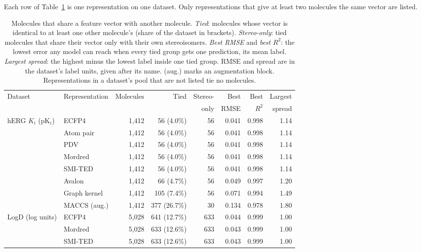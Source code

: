 Each row of Table~\ref{tab:flaws:ties} is one representation on one dataset. Only representations that give at least two molecules the same vector are listed.
\begin{table}[htbp]
\centering
\small
\setlength{\tabcolsep}{4pt}
\caption[Molecules that share a feature vector with another molecule.]{Molecules that share a feature vector with another molecule. \emph{Tied}: molecules whose vector is identical to at least one other molecule's (share of the dataset in brackets). \emph{Stereo-only}: tied molecules that share their vector only with their own stereoisomers. \emph{Best RMSE} and \emph{best $R^2$}: the lowest error any model can reach when every tied group gets one prediction, its mean label. \emph{Largest spread}: the highest minus the lowest label inside one tied group. RMSE and spread are in the dataset's label units, given after its name. (aug.) marks an augmentation block. Representations in a dataset's pool that are not listed tie no molecules.}
\label{tab:flaws:ties}
\begin{adjustbox}{max width=\textwidth}
\begin{tabular}{llrrrrrr}
\toprule
Dataset & Representation & Molecules & Tied & Stereo- & Best & Best & Largest \\
 & & & & only & RMSE & $R^2$ & spread \\
\midrule
hERG $K_i$ (pK$_i$) & ECFP4 & 1,412 & 56 (4.0\%) & 56 & 0.041 & 0.998 & 1.14 \\
 & Atom pair & 1,412 & 56 (4.0\%) & 56 & 0.041 & 0.998 & 1.14 \\
 & PDV & 1,412 & 56 (4.0\%) & 56 & 0.041 & 0.998 & 1.14 \\
 & Mordred & 1,412 & 56 (4.0\%) & 56 & 0.041 & 0.998 & 1.14 \\
 & SMI-TED & 1,412 & 56 (4.0\%) & 56 & 0.041 & 0.998 & 1.14 \\
 & Avalon & 1,412 & 66 (4.7\%) & 56 & 0.049 & 0.997 & 1.20 \\
 & Graph kernel & 1,412 & 105 (7.4\%) & 56 & 0.071 & 0.994 & 1.49 \\
 & MACCS (aug.) & 1,412 & 377 (26.7\%) & 30 & 0.134 & 0.978 & 1.80 \\
\midrule
LogD (log units) & ECFP4 & 5,028 & 641 (12.7\%) & 633 & 0.044 & 0.999 & 1.00 \\
 & Mordred & 5,028 & 633 (12.6\%) & 633 & 0.043 & 0.999 & 1.00 \\
 & SMI-TED & 5,028 & 633 (12.6\%) & 633 & 0.043 & 0.999 & 1.00 \\

\end{tabular}
\end{adjustbox}
\end{table}
